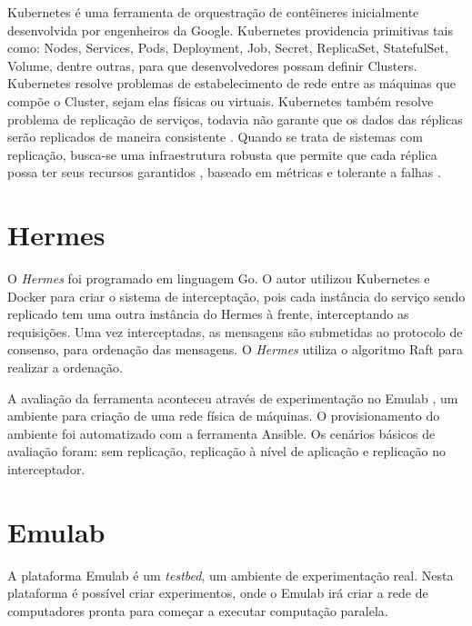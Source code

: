 \documentclass[12pt]{article}
\begin{document}
Kubernetes é uma ferramenta de orquestração de contêineres inicialmente desenvolvida por engenheiros da Google. Kubernetes providencia primitivas tais como: Nodes, Services, Pods, Deployment, Job, Secret, ReplicaSet, StatefulSet, Volume, dentre outras, para que desenvolvedores possam definir Clusters. Kubernetes resolve problemas de estabelecimento de rede entre as máquinas que compõe o Cluster, sejam elas físicas ou virtuais. Kubernetes também resolve problema de replicação de serviços, todavia não garante que os dados das réplicas serão replicados de maneira consistente \cite{kubernetes/docs/2022}. Quando se trata de sistemas com replicação, busca-se uma infraestrutura robusta que permite que cada réplica possa ter seus recursos garantidos \cite{Stubbs2015DistributedSO}, baseado em métricas e tolerante a falhas \cite{vayghan2021kubernetes}.

\section{Hermes} \label{sec:hermes}

O \textit{Hermes} \cite{renan2021hermes} foi programado em linguagem Go. O autor utilizou Kubernetes e Docker para criar o sistema de interceptação, pois cada instância do serviço sendo replicado tem uma outra instância do Hermes à frente, interceptando as requisições. Uma vez interceptadas, as mensagens são submetidas ao protocolo de consenso, para ordenação das mensagens. O \textit{Hermes} utiliza o algoritmo Raft para realizar a ordenação.


A avaliação da ferramenta aconteceu através de experimentação no Emulab \cite{emulab-10.1145/844128.844152}, um ambiente para criação de uma rede física de máquinas. O provisionamento do ambiente foi automatizado com a ferramenta Ansible. Os cenários básicos de avaliação foram: sem replicação, replicação à nível de aplicação e replicação no interceptador.

\section{Emulab}

A plataforma Emulab \cite{emulab-10.1145/844128.844152} é um \textit{testbed}, um ambiente de experimentação real. Nesta plataforma é possível criar experimentos, onde o Emulab irá criar a rede de computadores pronta para começar a executar computação paralela.
\end{document}
